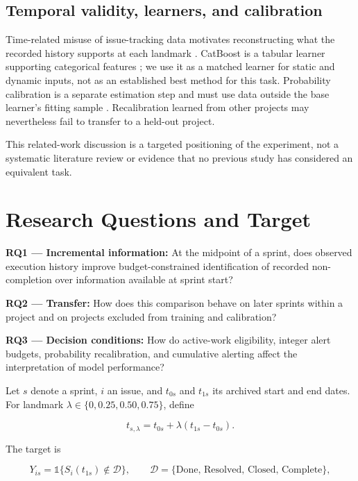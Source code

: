 \documentclass[11pt,a4paper]{article}
\begin{document}
\subsection{Temporal validity, learners, and calibration}\label{temporal-validity-learners-and-calibration}

Time-related misuse of issue-tracking data motivates reconstructing what the recorded history supports at each landmark \cite{tu2018careful}. CatBoost is a tabular learner supporting categorical features \cite{prokhorenkova2018catboost}; we use it as a matched learner for static and dynamic inputs, not as an established best method for this task. Probability calibration is a separate estimation step and must use data outside the base learner's fitting sample \cite{sklearncalibration}. Recalibration learned from other projects may nevertheless fail to transfer to a held-out project.

This related-work discussion is a targeted positioning of the experiment, not a systematic literature review or evidence that no previous study has considered an equivalent task.

\section{Research Questions and Target}\label{research-questions-and-target}

\textbf{RQ1 --- Incremental information:} At the midpoint of a sprint, does observed execution history improve budget-constrained identification of recorded non-completion over information available at sprint start?

\textbf{RQ2 --- Transfer:} How does this comparison behave on later sprints within a project and on projects excluded from training and calibration?

\textbf{RQ3 --- Decision conditions:} How do active-work eligibility, integer alert budgets, probability recalibration, and cumulative alerting affect the interpretation of model performance?

Let \(s\) denote a sprint, \(i\) an issue, and \(t_{0s}\) and \(t_{1s}\) its archived start and end dates. For landmark \(\lambda\in\{0,0.25,0.50,0.75\}\), define

\[
t_{s,\lambda}=t_{0s}+\lambda(t_{1s}-t_{0s}).
\]

The target is

\[
Y_{is}=\mathbb{1}\{S_i(t_{1s})\notin\mathcal D\},
\qquad \mathcal D=\{\text{Done, Resolved, Closed, Complete}\},
\]
\end{document}
